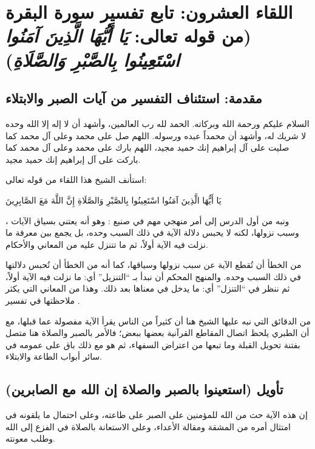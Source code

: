 \chapter{اللقاء العشرون: تابع تفسير سورة البقرة (من قوله تعالى: \textit{يَا أَيُّهَا الَّذِينَ آمَنُوا اسْتَعِينُوا بِالصَّبْرِ وَالصَّلَاةِ})}

\section{مقدمة: استئناف التفسير من آيات الصبر والابتلاء}
السلام عليكم ورحمة الله وبركاته. الحمد لله رب العالمين، وأشهد أن لا إله إلا الله وحده لا شريك له، وأشهد أن محمداً عبده ورسوله. اللهم صل على محمد وعلى آل محمد كما صليت على آل إبراهيم إنك حميد مجيد، اللهم بارك على محمد وعلى آل محمد كما باركت على آل إبراهيم إنك حميد مجيد.

استأنف الشيخ هذا اللقاء من قوله تعالى: \begin{ayah}يَا أَيُّهَا الَّذِينَ آمَنُوا اسْتَعِينُوا بِالصَّبْرِ وَالصَّلَاةِ إِنَّ اللَّهَ مَعَ الصَّابِرِينَ\end{ayah}، ونبه من أول الدرس إلى أمر منهجي مهم في صنيع : وهو أنه يعتني بسياق الآيات وسبب نزولها، لكنه لا يحبس دلالة الآية في ذلك السبب وحده، بل يجمع بين معرفة ما نزلت فيه الآية أولاً، ثم ما تتنزل عليه من المعاني والأحكام.

\begin{fawaid}
من الخطأ أن تُقطع الآية عن سبب نزولها وسياقها، كما أنه من الخطأ أن تُحبس دلالتها في ذلك السبب وحده. والمنهج المحكم أن نبدأ بـ ``التنزيل'' أي: ما نزلت فيه الآية أولاً، ثم ننظر في ``التنزل'' أي: ما يدخل في معناها بعد ذلك. وهذا من المعاني التي يكثر ملاحظتها في تفسير .
\end{fawaid}

\begin{fawaid}
من الدقائق التي نبه عليها الشيخ هنا أن كثيراً من الناس يقرأ الآية مفصولة عما قبلها، مع أن الطبري يلحظ اتصال المقاطع القرآنية بعضها ببعض؛ فالأمر بالصبر والصلاة هنا متصل بفتنة تحويل القبلة وما تبعها من اعتراض السفهاء، ثم هو مع ذلك باق على عمومه في سائر أبواب الطاعة والابتلاء.
\end{fawaid}

\separator

\section{تأويل (استعينوا بالصبر والصلاة إن الله مع الصابرين)}
 إن هذه الآية حث من الله للمؤمنين على الصبر على طاعته، وعلى احتمال ما يلقونه في امتثال أمره من المشقة ومقالة الأعداء، وعلى الاستعانة بالصلاة في الفزع إلى الله وطلب معونته.

